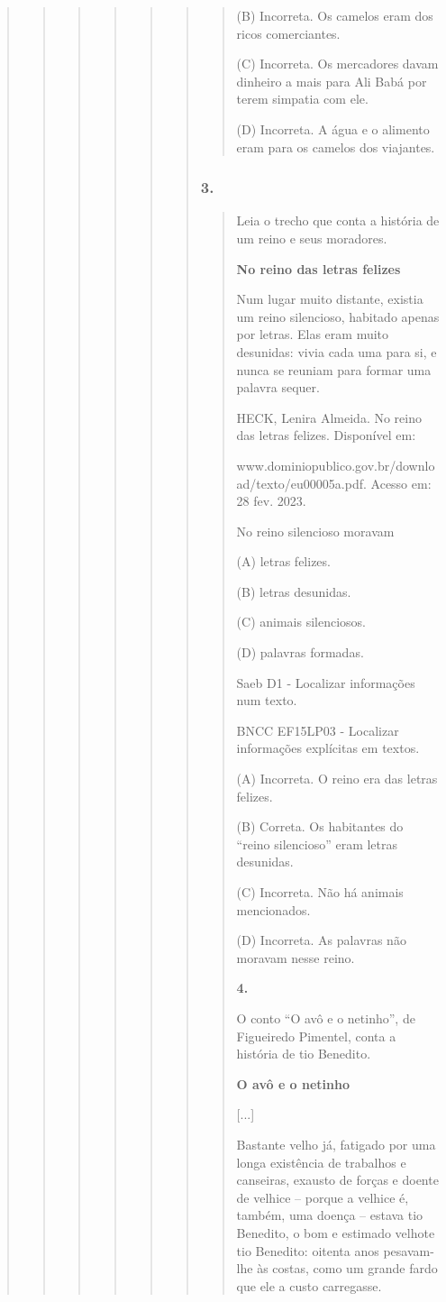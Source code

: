 \begin{quote}
\begin{quote}
\begin{quote}
\begin{quote}
\begin{quote}
\begin{quote}
\begin{quote}
(B) Incorreta. Os camelos eram dos ricos comerciantes.

(C) Incorreta. Os mercadores davam dinheiro a mais para Ali Babá por
terem simpatia com ele.

(D) Incorreta. A água e o alimento eram para os camelos dos viajantes.
\end{quote}

\subsubsection{3. }\label{section-90}

\begin{quote}
Leia o trecho que conta a história de um reino e seus moradores.

\textbf{No reino das letras felizes}

Num lugar muito distante, existia um reino silencioso, habitado apenas
por letras. Elas eram muito desunidas: vivia cada uma para si, e nunca
se reuniam para formar uma palavra sequer.

HECK, Lenira Almeida. No reino das letras felizes. Disponível em:

www.dominiopublico.gov.br/download/texto/eu00005a.pdf. Acesso em: 28
fev. 2023.

No reino silencioso moravam

(A) letras felizes.

(B) letras desunidas.

(C) animais silenciosos.

(D) palavras formadas.

Saeb D1 - Localizar informações num texto.

BNCC EF15LP03 - Localizar informações explícitas em textos.

(A) Incorreta. O reino era das letras felizes.

(B) Correta. Os habitantes do ``reino silencioso'' eram letras
desunidas.

(C) Incorreta. Não há animais mencionados.

(D) Incorreta. As palavras não moravam nesse reino.

\textbf{4.}

O conto ``O avô e o netinho'', de Figueiredo Pimentel, conta a história
de tio Benedito.

\textbf{O avô e o netinho}

{[}...{]}

Bastante velho já, fatigado por uma longa existência de trabalhos e
canseiras, exausto de forças e doente de velhice -- porque a velhice é,
também, uma doença -- estava tio Benedito, o bom e estimado velhote tio
Benedito: oitenta anos pesavam-lhe às costas, como um grande fardo que
ele a custo carregasse.


\end{quote}
\end{quote}
\end{quote}
\end{quote}
\end{quote}
\end{quote}
\end{quote}
